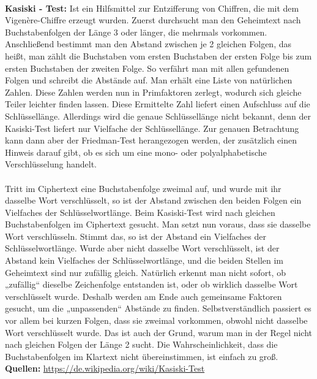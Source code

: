 \documentclass[12pt,a4paper]{report}
\begin{document}




\ \\
\textbf{Kasiski - Test:}
Ist ein Hilfsmittel zur Entzifferung von Chiffren, die mit dem Vigenère-Chiffre erzeugt wurden.
Zuerst durchsucht man den Geheimtext nach Buchstabenfolgen der Länge 3 oder länger, die mehrmals vorkommen. Anschließend bestimmt man den Abstand zwischen je 2 gleichen Folgen, das heißt, man zählt die Buchstaben vom ersten Buchstaben der ersten Folge bis zum ersten Buchstaben der zweiten Folge. So verfährt man mit allen gefundenen Folgen und schreibt die Abstände auf. Man erhält eine Liste von natürlichen Zahlen. Diese Zahlen werden nun in Primfaktoren zerlegt, wodurch sich gleiche Teiler leichter finden lassen. Diese Ermittelte Zahl liefert einen Aufschluss auf die Schlüssellänge. Allerdings wird die genaue Schlüssellänge nicht bekannt, denn der Kasiski-Test liefert nur Vielfache der Schlüssellänge. Zur genauen Betrachtung kann dann aber der Friedman-Test herangezogen werden, der zusätzlich einen Hinweis darauf gibt, ob es sich um eine mono- oder polyalphabetische Verschlüsselung handelt.
\\
\\
Tritt im Ciphertext eine Buchstabenfolge zweimal auf, und wurde mit ihr dasselbe Wort verschlüsselt, so ist der Abstand zwischen den beiden Folgen ein Vielfaches der Schlüsselwortlänge. Beim Kasiski-Test wird nach gleichen Buchstabenfolgen im Ciphertext gesucht. Man setzt nun voraus, dass sie dasselbe Wort verschlüsseln. Stimmt das, so ist der Abstand ein Vielfaches der Schlüsselwortlänge. Wurde aber nicht dasselbe Wort verschlüsselt, ist der Abstand kein Vielfaches der Schlüsselwortlänge, und die beiden Stellen im Geheimtext sind nur zufällig gleich. Natürlich erkennt man nicht sofort, ob „zufällig“ dieselbe Zeichenfolge entstanden ist, oder ob wirklich dasselbe Wort verschlüsselt wurde. Deshalb werden am Ende auch gemeinsame Faktoren gesucht, um die „unpassenden“ Abstände zu finden. Selbstverständlich passiert es vor allem bei kurzen Folgen, dass sie zweimal vorkommen, obwohl nicht dasselbe Wort verschlüsselt wurde. Das ist auch der Grund, warum man in der Regel nicht nach gleichen Folgen der Länge 2 sucht. Die Wahrscheinlichkeit, dass die Buchstabenfolgen im Klartext nicht übereinstimmen, ist einfach zu groß.
\\
\textbf{Quellen:}
\url{https://de.wikipedia.org/wiki/Kasiski-Test}
\end{document}
